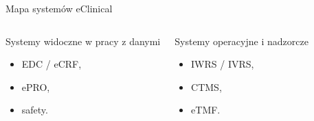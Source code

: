 \begin{frame}{Mapa systemów eClinical}
  \begin{columns}[T,onlytextwidth]
    \begin{block}{Systemy widoczne w pracy z danymi}
      \begin{itemize}
        \item EDC / eCRF,
        \item ePRO,
        \item safety.
      \end{itemize}
    \end{block}

    \begin{block}{Systemy operacyjne i nadzorcze}
      \begin{itemize}
        \item IWRS / IVRS,
        \item CTMS,
        \item eTMF.
      \end{itemize}
    \end{block}
  \end{columns}
\end{frame}


